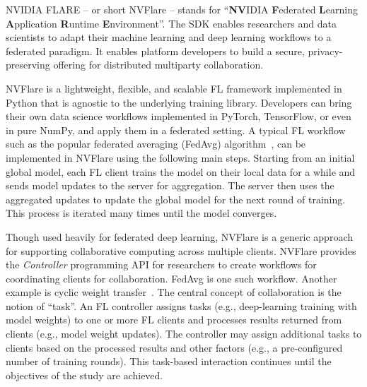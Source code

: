 \documentclass[11pt]{article}
\begin{document}
NVIDIA FLARE -- or short NVFlare -- stands for ``\textbf{NV}IDIA \textbf{F}ederated \textbf{L}earning \textbf{A}pplication \textbf{R}untime \textbf{E}nvironment''.
The SDK enables researchers and data scientists to adapt their machine learning and deep learning workflows to a federated paradigm. It enables platform developers to build a secure, privacy-preserving offering for distributed multiparty collaboration.

NVFlare is a lightweight, flexible, and scalable FL framework implemented in Python that is agnostic to the underlying training library. Developers can bring their own data science workflows implemented in PyTorch, TensorFlow, or even in pure NumPy, and apply them in a federated setting.
%
A typical FL workflow such as the popular federated averaging (FedAvg) algorithm~\cite{Holger-mcmahan2017communication}, can be implemented in NVFlare using the following main steps. Starting from an initial global model, each FL client trains the model on their local data for a while and sends model updates to the server for aggregation. The server then uses the aggregated updates to update the global model for the next round of training. This process is iterated many times until the model converges.

Though used heavily for federated deep learning, NVFlare is a generic approach for supporting collaborative computing across multiple clients. NVFlare provides the \textit{Controller} programming API for researchers to create workflows for coordinating clients for collaboration. FedAvg is one such workflow. Another example is cyclic weight transfer~\cite{Holger-chang2018distributed}.
%
The central concept of collaboration is the notion of ``task''. An FL controller assigns tasks (e.g., deep-learning training with model weights) to one or more FL clients and processes results returned from clients (e.g., model weight updates). The controller may assign additional tasks to clients based on the processed results and other factors (e.g., a pre-configured number of training rounds). This task-based interaction continues until the objectives of the study are achieved.
\end{document}
